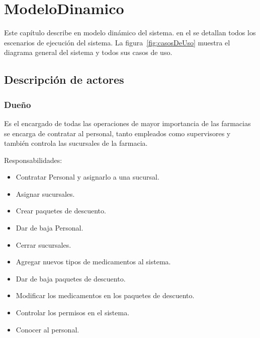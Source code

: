\chapter{ModeloDinamico}	


	Este capítulo describe en modelo dinámico del sistema. en el se detallan todos los escenarios de ejecución del sistema. La figura~\ref{fig:casosDeUso} muestra el diagrama general del sistema y todos sus casos de uso.

\section{Descripción de actores}

\begin{Usuario}{\hypertarget{Dueño}{\subsection{Dueño}}}{
	Es el encargado de todas las operaciones de mayor importancia de las farmacias
	se encarga de contratar al personal, tanto empleados como supervisores y también controla las sucursales de la farmacia.
}
    \item[Responsabilidades:] \cdtEmpty
    \begin{itemize}
		\item Contratar Personal y asignarlo a una sucursal.
		\item Asignar  sucursales.
		\item Crear paquetes de descuento.
		\item Dar de baja Personal.
		\item Cerrar sucursales.
		\item Agregar nuevos tipos de medicamentos al sistema.
		\item Dar de baja paquetes de descuento.
		\item Modificar los medicamentos en los paquetes de descuento.
		\item Controlar los permisos en el sistema.
		\item Conocer al personal.	
    \end{itemize}
\end{Usuario}

